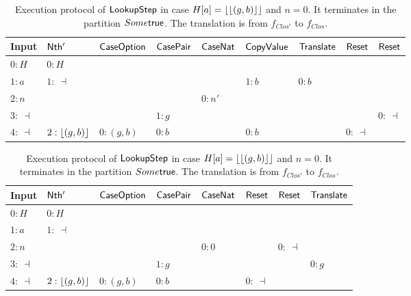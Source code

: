 \begin{table}[H]
  \scriptsize
  \begin{tabular}{l||l|l|l|l|l|l|l|l}
    Input       & $\mathsf{Nth'}$      & $\mathsf{CaseOption}$       & $\mathsf{CasePair}$     & $\mathsf{CaseNat}$ & $\mathsf{CopyValue}$  & $\mathsf{Translate}$ & $\mathsf{Reset}$ & $\mathsf{Reset}$ \\ \hline
    $0:H$       & $0:H$            &                       &                      &                 &                   &                  &              &              \\
    $1:a$       & $1:~\dashv$      &                       &                      &                 & $1:b$             & $0:b$            &              &              \\
    $2:n$       &                  &                       &                      & $0:n'$          &                   &                  &              &              \\
    $3:~\dashv$ &                  &                       & $1: g$               &                 &                   &                  &              & $0:~\dashv$  \\
    $4:~\dashv$ & $2:\left\lfloor {(g,b)} \right\rfloor$ & $0:(g,b)$             & $0:b$                &                 & $0:b$             &                  & $0:~\dashv$  &              \\
  \end{tabular}
  \caption{Execution protocol of $\mathsf{LookupStep}$ in case $H[a] = \left\lfloor {\left\lfloor {(g,b)} \right\rfloor} \right\rfloor$ and $n=S~n'$.  It terminates in the partition $\None$.  The
    translation is from $f_{next}$ to $f_{add}$.}
  \label{tab:exec-LookupStep-S}
  \begin{tabular}{l||l|l|l|l|l|l|l}
    Input       & $\mathsf{Nth'}$      & $\mathsf{CaseOption}$       & $\mathsf{CasePair}$     & $\mathsf{CaseNat}$ & $\mathsf{Reset}$ & $\mathsf{Reset}$ & $\mathsf{Translate}$ \\ \hline
    $0:H$       & $0:H$            &                       &                      &                 &              &              &                  \\
    $1:a$       & $1:~\dashv$      &                       &                      &                 &              &              &                  \\
    $2:n$       &                  &                       &                      & $0:0$           &              & $0:~\dashv$  &                  \\
    $3:~\dashv$ &                  &                       & $1: g$               &                 &              &              & $0:g$            \\
    $4:~\dashv$ & $2:\left\lfloor {(g,b)} \right\rfloor$ & $0:(g,b)$             & $0:b$                &                 & $0:~\dashv$  &              &                  \\
  \end{tabular}
  \caption{Execution protocol of $\mathsf{LookupStep}$ in case $H[a] = \left\lfloor {\left\lfloor {(g,b)} \right\rfloor} \right\rfloor$ and $n=0$.  It terminates in the partition $Some\mathsf{true}$.  The
    translation is from $f_{Clos'}$ to $f_{Clos}$.}
  \label{tab:exec-LookupStep-0}
\end{table}

